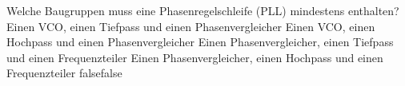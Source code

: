     {Welche Baugruppen muss eine Phasenregelschleife (PLL) mindestens enthalten?}
    {Einen VCO, einen Tiefpass und einen Phasenvergleicher}
    {Einen VCO, einen Hochpass und einen Phasenvergleicher}
    {Einen Phasenvergleicher, einen Tiefpass und einen Frequenzteiler}
    {Einen Phasenvergleicher, einen Hochpass und einen Frequenzteiler}
    {false}{false}